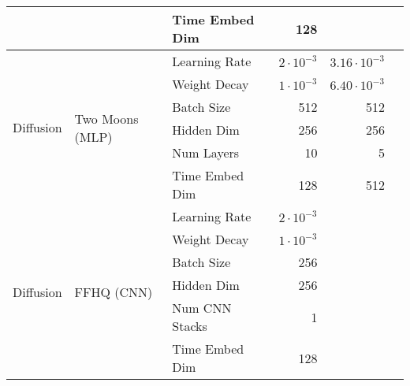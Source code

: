 \documentclass{article}
\begin{document}
\begin{table}[H]
\begin{tabular}{lllrrr}
		                               &                                  & Time Embed Dim          & 128                &                     \\
		\midrule
		\multirow{6}{*}{Diffusion}     & \multirow{6}{*}{Two Moons (MLP)}
		                               & Learning Rate                    & $2\cdot10^{-3}$         & $3.16\cdot10^{-3}$                       \\
		                               &                                  & Weight Decay            & $1\cdot10^{-3}$    & $6.40\cdot10^{-3}$  \\
		                               &                                  & Batch Size              & 512                & 512                 \\
		                               &                                  & Hidden Dim              & 256                & 256                 \\
		                               &                                  & Num Layers              & 10                 & 5                   \\
		                               &                                  & Time Embed Dim          & 128                & 512                 \\
		\midrule
		\multirow{6}{*}{Diffusion}     & \multirow{6}{*}{FFHQ (CNN)}
		                               & Learning Rate                    & $2\cdot10^{-3}$         &                                          \\
		                               &                                  & Weight Decay            & $1\cdot10^{-3}$    &                     \\
		                               &                                  & Batch Size              & 256                &                     \\
		                               &                                  & Hidden Dim              & 256                &                     \\
		                               &                                  & Num CNN Stacks          & 1                  &                     \\
		                               &                                  & Time Embed Dim          & 128                &                     \\
		\bottomrule
	\end{tabular}
\end{table}



\end{document}
